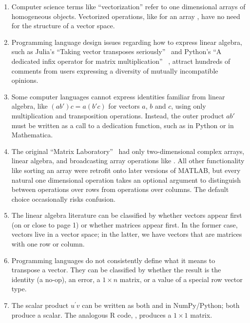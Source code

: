 \begin{enumerate}

\item
Computer science terms like ``vectorization'' refer to one dimensional arrays
of homogeneous objects. Vectorized operations, like  for an array
, have no need for the structure of a vector space.

\item
Programming language design issues regarding how to express linear algebra,
such as Julia's ``Taking vector transposes seriously''~\cite{julia4774} and
Python's ``A dedicated infix operator for matrix multiplication''~
\cite{numpy4351,Smith2014}, attract hundreds of comments from users expressing
a diversity of mutually incompatible opinions.

\item
Some computer languages cannot express identities familiar from linear algebra,
like $(ab')c = a(b'c)$ for vectors $a$, $b$ and $c$, using only multiplication
and transposition operations. Instead, the outer product $ab'$ must be written
as a call to a dedication function, such as
\cite{numpy.outer} in Python or
\cite{Wolfram.Outer} in Mathematica.

\item
The original ``Matrix Laboratory''~\cite{Moler1980} had only
two-dimensional complex arrays, linear algebra, and broadcasting array
operations like . All other functionality like sorting an array
were retrofit onto later versions of MATLAB, but every natural one dimensional
operation takes an optional  argument to distinguish between
operations over rows from operations over columns. The default 
choice occasionally risks confusion.

\item
The linear algebra literature can be classified by whether vectors
appear first (on or close to page 1) or whether matrices appear first.
In the former case, vectors live in a vector space; in the latter,
we have vectors that are matrices with one row or column.

\item
Programming languages do not consistently define what it means to transpose a vector. They can be classified by whether the result is the identity (a no-op), an error, a $1\times n$ matrix, or a value of a special row vector type.

\item
The scalar product $u^\prime v$ can be written as both  and
 in NumPy/Python; both produce a scalar. The analogous R code, , produces a $1\times1$ matrix.


\end{enumerate}
